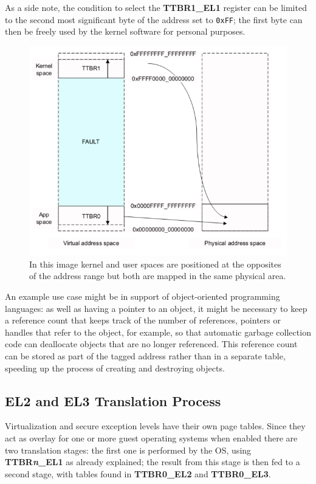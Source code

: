 \documentclass[12pt,a4paper,openright,twoside]{report}
\begin{document}
 As a side note, the condition to select the \textbf{TTBR1\_EL1} register can
 be limited to the second most significant byte of the address set to {\tt 0xFF};
 the first byte can then be freely used by the kernel software for personal 
 purposes.

 \begin{figure}[h]
 \includegraphics[scale=0.6]{images/tesi11.png} 
 \caption[Kernel memory virtualization]{In this image kernel and user spaces 
 are positioned at the opposites of the address range but both are mapped in 
 the same physical area.}\label{fig:rammap}
 \end{figure}


 An example use case might be in support of object-oriented programming languages:
 as well as having a pointer to an object, it might be necessary to keep a 
reference count that keeps track of the number of references, pointers or handles
 that refer to the object, for example, so that automatic garbage collection 
 code can deallocate objects that are no longer referenced. This reference 
 count can be stored as part of the tagged address rather than in a separate table, 
speeding up the process of creating and destroying objects.

\subsection{EL2 and EL3 Translation Process}
Virtualization and secure exception levels have their own page tables. Since they act
as overlay for one or more guest operating systems when enabled there are two translation
stages: the first one is performed by the OS, using \textbf{TTBR\textit{n}\_EL1}
as already explained; the result from this stage is then fed to a second stage,
with tables found in \textbf{TTBR0\_EL2} and \textbf{TTBR0\_EL3}.
\end{document}
